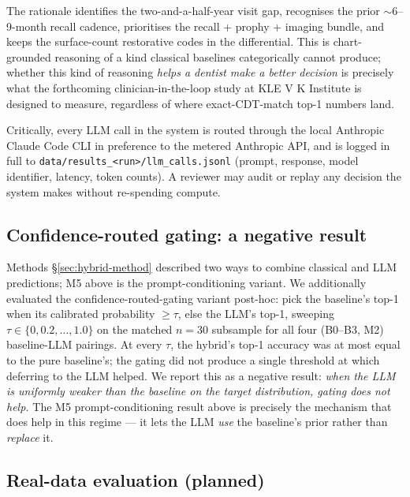 \documentclass[preprint,authoryear,1p,12pt]{elsarticle}
\begin{document}
The rationale identifies the two-and-a-half-year visit gap, recognises
the prior $\sim$6--9-month recall cadence, prioritises the recall + prophy
+ imaging bundle, and keeps the surface-count restorative codes in the
differential. This is chart-grounded reasoning of a kind classical
baselines categorically cannot produce; whether this kind of reasoning
\emph{helps a dentist make a better decision} is precisely what the
forthcoming clinician-in-the-loop study at KLE V K Institute is designed
to measure, regardless of where exact-CDT-match top-1 numbers land.

Critically, every LLM call in the system is routed through the local
Anthropic Claude Code CLI in preference to the metered Anthropic API, and is
logged in full to \texttt{data/results\_<run>/llm\_calls.jsonl} (prompt,
response, model identifier, latency, token counts). A reviewer may audit
or replay any decision the system makes without re-spending compute.

\subsection{Confidence-routed gating: a negative result}
\label{sec:gating}

Methods \S\ref{sec:hybrid-method} described two ways to combine
classical and LLM predictions; M5 above is the prompt-conditioning
variant. We additionally evaluated the confidence-routed-gating variant
post-hoc: pick the baseline's top-1 when its calibrated probability
$\geq \tau$, else the LLM's top-1, sweeping
$\tau \in \{0, 0.2, \dots, 1.0\}$ on the matched $n{=}30$ subsample for
all four (B0--B3, M2) baseline-LLM pairings. At every $\tau$, the
hybrid's top-1 accuracy was at most equal to the pure baseline's; the
gating did not produce a single threshold at which deferring to the
LLM helped. We report this as a negative result: \emph{when the LLM is
uniformly weaker than the baseline on the target distribution, gating
does not help.} The M5 prompt-conditioning result above is precisely the
mechanism that does help in this regime --- it lets the LLM \emph{use}
the baseline's prior rather than \emph{replace} it.

\subsection{Real-data evaluation (planned)}
\label{sec:realdata-plan}
\end{document}
